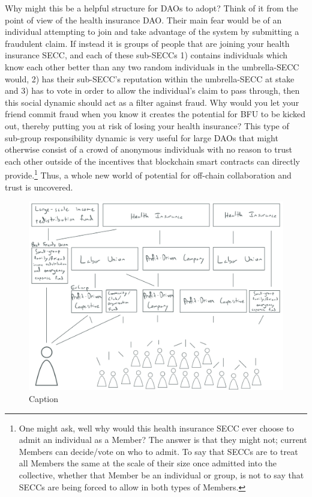 \documentclass{article}[10pt]
\begin{document}
Why might this be a helpful structure for DAOs to adopt?
Think of it from the point of view of the health insurance DAO.
Their main fear would be of an individual attempting to join and take advantage of the system by submitting a fraudulent claim.
If instead it is groups of people that are joining your health insurance SECC, and each of these sub-SECCs 1) contains individuals which know each other better than any two random individuals in the umbrella-SECC would, 2) has their sub-SECC's reputation within the umbrella-SECC at stake and 3) has to vote in order to allow the individual's claim to pass through, then this social dynamic should act as a filter against fraud. 
Why would you let your friend commit fraud when you know it creates the potential for BFU to be kicked out, thereby putting you at risk of losing your health insurance?
This type of sub-group responsibility dynamic is very useful for large DAOs that might otherwise consist of a crowd of anonymous individuals with no reason to trust each other outside of the incentives that blockchain smart contracts can directly provide.\footnote{
    One might ask, well why would this health insurance SECC ever choose to admit an individual as a Member?
    The answer is that they might not; current Members can decide/vote on who to admit.
    To say that SECCs are to treat all Members the same at the scale of their size once admitted into the collective, whether that Member be an individual or group, is not to say that SECCs are being forced to allow in both types of Members.}
Thus, a whole new world of potential for off-chain collaboration and trust is uncovered.\par

\begin{figure}[! ht]
    \centering
    \includegraphics[width=\textwidth]{figures/IMG_B0CE257AF90D-1.pdf}
    \caption{Caption}
    \label{fig:modular_groups}
\end{figure}
\end{document}
